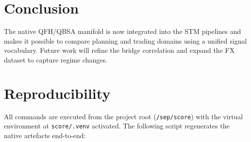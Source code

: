 \documentclass[11pt]{article}
\begin{document}
\section{Conclusion}
The native QFH/QBSA manifold is now integrated into the STM pipelines and makes it possible to compare planning and trading domains using a unified signal vocabulary. Future work will refine the bridge correlation and expand the FX dataset to capture regime changes.

\appendix
\section{Reproducibility}
All commands are executed from the project root (\texttt{/sep/score}) with the virtual environment at \texttt{score/.venv} activated.
The following script regenerates the native artefacts end-to-end:
\end{document}
